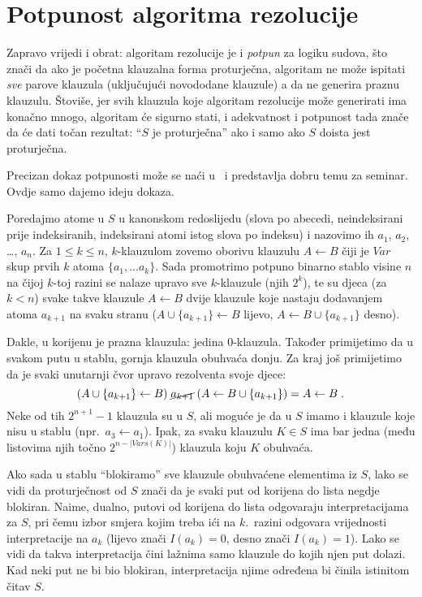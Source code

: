 \section{Potpunost algoritma rezolucije}

Zapravo vrijedi i obrat: algoritam rezolucije je i \emph{potpun} za logiku sudova, što znači da ako je početna klauzalna forma proturječna, algoritam ne može ispitati \emph{sve} parove klauzula (uključujući novododane klauzule) a da ne generira praznu klauzulu. Štoviše, jer svih klauzula koje algoritam rezolucije može generirati ima konačno mnogo, algoritam će sigurno stati, i adekvatnost i potpunost tada znače da će dati točan rezultat: \enquote{$S$ je proturječna} ako i samo ako $S$ doista jest proturječna.

Precizan dokaz potpunosti može se naći u~\cite{BenAri} i predstavlja dobru temu za seminar. Ovdje samo dajemo ideju dokaza.

Poredajmo atome u $S$ u kanonskom redoslijedu (slova po abecedi, neindeksirani prije indeksiranih, indeksirani atomi istog slova po indeksu) i nazovimo ih $a_1$, $a_2$, \ldots, $a_n$. Za $1\le k\le n$, $k$-klauzulom zovemo oborivu klauzulu $A\leftarrow B$ čiji je $Var$ skup prvih $k$ atoma $\{a_1,...a_k\}$.
Sada promotrimo potpuno binarno stablo visine $n$ na čijoj $k$-toj razini se nalaze upravo sve $k$-klauzule (njih $2^k$), te su djeca (za $k<n$) svake takve klauzule
$A\leftarrow B$ dvije klauzule koje nastaju dodavanjem atoma $a_{k+1}$ na svaku stranu ($A\cup\{a_{k+1}\}\leftarrow B$ lijevo, $A\leftarrow B\cup\{a_{k+1}\}$ desno). 

Dakle, u korijenu je prazna klauzula: jedina $0$-klauzula. Također primijetimo da u svakom putu u stablu, gornja klauzula obuhvaća donju. Za kraj još primijetimo da je svaki unutarnji čvor upravo rezolventa svoje djece: $$(A\cup\{a_{k+1}\}\leftarrow B)\;\cancel{a_{k+1}}\;(A\leftarrow B\cup\{a_{k+1}\})=A\leftarrow B\;.$$
Neke od tih $2^{n+1}-1$ klauzula su u $S$, ali moguće je da u $S$ imamo i klauzule koje nisu u stablu (npr.\ $a_3\leftarrow a_1$). Ipak, za svaku klauzulu $K\in S$ ima bar jedna (među listovima njih točno $2^{n-\left|Vars(K)\right|}$) klauzula koju $K$ obuhvaća.

Ako sada u stablu \enquote{blokiramo} sve klauzule obuhvaćene elementima iz $S$, lako se vidi da proturječnost od $S$ znači da je svaki put od korijena do lista negdje blokiran. Naime, dualno, putovi od korijena do lista odgovaraju interpretacijama za $S$, pri čemu izbor smjera kojim treba ići na $k$.\ razini odgovara vrijednosti interpretacije na $a_k$ (lijevo znači $I(a_k)=0$, desno znači $I(a_k)=1$). Lako se vidi da takva interpretacija čini lažnima samo klauzule do kojih njen put dolazi. Kad neki put ne bi bio blokiran, interpretacija njime određena bi činila istinitom čitav $S$.

